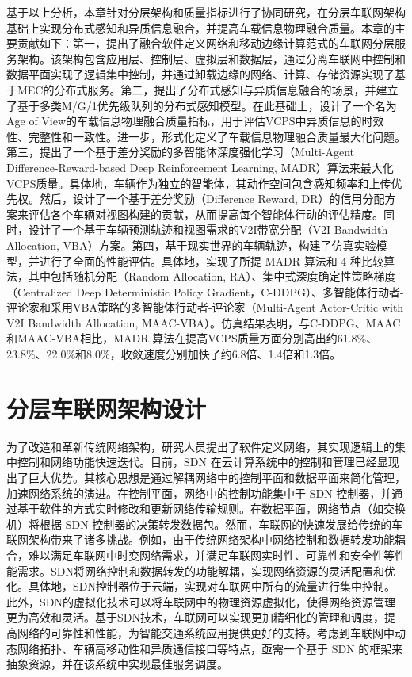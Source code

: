基于以上分析，本章针对分层架构和质量指标进行了协同研究，在分层车联网架构基础上实现分布式感知和异质信息融合，并提高车载信息物理融合质量。本章的主要贡献如下：第一，提出了融合软件定义网络和移动边缘计算范式的车联网分层服务架构。该架构包含应用层、控制层、虚拟层和数据层，通过分离车联网中控制和数据平面实现了逻辑集中控制，并通过卸载边缘的网络、计算、存储资源实现了基于MEC的分布式服务。第二，提出了分布式感知与异质信息融合的场景，并建立了基于多类M/G/1优先级队列的分布式感知模型。在此基础上，设计了一个名为Age of View的车载信息物理融合质量指标，用于评估VCPS中异质信息的时效性、完整性和一致性。进一步，形式化定义了车载信息物理融合质量最大化问题。第三，提出了一个基于差分奖励的多智能体深度强化学习（Multi-Agent Difference-Reward-based Deep Reinforcement Learning, MADR）算法来最大化VCPS质量。具体地，车辆作为独立的智能体，其动作空间包含感知频率和上传优先权。然后，设计了一个基于差分奖励（Difference Reward, DR）的信用分配方案来评估各个车辆对视图构建的贡献，从而提高每个智能体行动的评估精度。同时，设计了一个基于车辆预测轨迹和视图需求的V2I带宽分配（V2I Bandwidth Allocation, VBA）方案。第四，基于现实世界的车辆轨迹，构建了仿真实验模型，并进行了全面的性能评估。具体地，实现了所提 MADR 算法和 4 种比较算法，其中包括随机分配（Random Allocation, RA）、集中式深度确定性策略梯度（Centralized Deep Deterministic Policy Gradient，C-DDPG）\cite{mlika2022deep}、多智能体行动者-评论家\cite{he2021efficient}和采用VBA策略的多智能体行动者-评论家（Multi-Agent Actor-Critic with V2I Bandwidth Allocation, MAAC-VBA）。仿真结果表明，与C-DDPG、MAAC和MAAC-VBA相比，MADR 算法在提高VCPS质量方面分别高出约61.8\%、23.8\%、22.0\%和8.0\%，收敛速度分别加快了约6.8倍、1.4倍和1.3倍。

\section{分层车联网架构设计}\label{section 2-2}

为了改造和革新传统网络架构，研究人员提出了软件定义网络\cite{wang2020ji}，其实现逻辑上的集中控制和网络功能快速迭代。目前，SDN 在云计算系统中的控制和管理已经显现出了巨大优势\cite{jain2013network}。其核心思想是通过解耦网络中的控制平面和数据平面来简化管理，加速网络系统的演进。在控制平面，网络中的控制功能集中于 SDN 控制器，并通过基于软件的方式实时修改和更新网络传输规则。在数据平面，网络节点（如交换机）将根据 SDN 控制器的决策转发数据包。然而，车联网的快速发展给传统的车联网架构带来了诸多挑战。例如，由于传统网络架构中网络控制和数据转发功能耦合，难以满足车联网中时变网络需求，并满足车联网实时性、可靠性和安全性等性能需求。SDN将网络控制和数据转发的功能解耦，实现网络资源的灵活配置和优化。具体地，SDN控制器位于云端，实现对车联网中所有的流量进行集中控制。此外，SDN的虚拟化技术可以将车联网中的物理资源虚拟化，使得网络资源管理更为高效和灵活。基于SDN技术，车联网可以实现更加精细化的管理和调度，提高网络的可靠性和性能，为智能交通系统应用提供更好的支持。考虑到车联网中动态网络拓扑、车辆高移动性和异质通信接口等特点，亟需一个基于 SDN 的框架来抽象资源，并在该系统中实现最佳服务调度。

